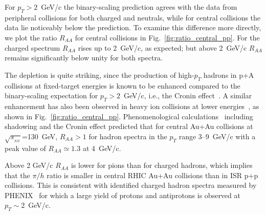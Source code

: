 \begin{multicols}{2}
For $p_T>2$~GeV/c the binary-scaling prediction
agrees with the data from peripheral collisions
for both charged and neutrals, while for central collisions
the data lie noticeably below the prediction.
To examine this difference more 
directly, we plot the ratio $R_{AA}$ for central collisions 
in Fig.~\ref{fig:ratio_central_pp}.  
For the charged spectrum $R_{AA}$ rises up to 2~GeV/c, as expected;
but above 2~GeV/c $R_{AA}$ remains significantly below unity for 
both spectra.  

The depletion is quite striking, since the production of high-$p_T$ 
hadrons in p+A collisions at fixed-target energies 
is known to be enhanced compared to the binary-scaling expectation 
for $p_T>2$~GeV/c, i.e., the Cronin effect~\cite{cronin}. 
A similar enhancement has also been observed in heavy ion collisions 
at lower energies~\cite{predict_nuclear_mod,ISR_alphaalpha}, 
as shown in Fig.~\ref{fig:ratio_central_pp}.
Phenomenological calculations~\cite{predict_nuclear_mod}  
including shadowing and the Cronin effect predicted that
for central Au+Au collisions at $\sqrt{s_{_{NN}}}$=130~GeV,
$R_{AA} > 1$ for hadron spectra in the $p_T$ range 3--9~GeV/c 
with a peak value of $R_{AA} \simeq 1.3$ at 4~GeV/c.


%

Above 2 GeV/c $R_{AA}$ is lower for pions than for charged 
hadrons, which implies that the $\pi/h$ ratio is smaller in central 
RHIC Au+Au collisions than in ISR p+p collisions.  This is 
consistent with identified charged hadron spectra measured 
by PHENIX~\cite{juliaQM01} for which a large yield of protons 
and antiprotons is observed at $p_T\sim 2$~GeV/c.  



\end{multicols}

